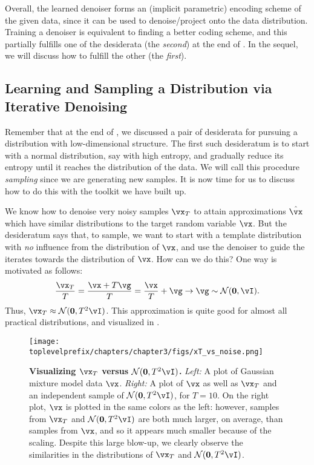 \documentclass[../../book-main.tex]{subfiles}
\begin{document}
Overall, the learned denoiser forms an (implicit parametric) encoding scheme of the given data, since it can be used to denoise/project onto the data distribution. Training a denoiser is equivalent to finding a better coding scheme, and this partially fulfills one of the desiderata (the \textit{second}) at the end of . In the sequel, we will discuss how to fulfill the other (the \textit{first}).


\subsection{Learning and Sampling a Distribution via Iterative Denoising}\label{sub:sampling_denoising}

Remember that at the end of , we discussed a pair of desiderata for pursuing a distribution with low-dimensional structure. The first such desideratum is to start with a normal distribution, say with high entropy, and gradually reduce its entropy until it reaches the distribution of the data. We will call this procedure \textit{sampling} since we are generating new samples. It is now time for us to discuss how to do this with the toolkit we have built up.

We know how to denoise very noisy samples \(\vx_{T}\) to attain approximations \(\hat{\vx}\) which have similar distributions to the target random variable \(\vx\). But the desideratum says that, to sample, we want to start with a template distribution with \textit{no} influence from the distribution of \(\vx\), and use the denoiser to guide the iterates towards the distribution of \(\vx\). How can we do this? One way is motivated as follows:
\begin{equation}\label{eq:ve_converge_to_large_gaussian}
	\frac{\vx_{T}}{T} = \frac{\vx + T\vg}{T} = \frac{\vx}{T} + \vg \to \vg \sim \dNorm(\vzero, \vI).
\end{equation}
Thus, \(\vx_{T} \approx \dNorm(\vzero, T^{2}\vI)\). This approximation is quite good for almost all practical distributions, and visualized in .
\begin{figure}
	\centering 
	\texttt{[image: \\toplevelprefix/chapters/chapter3/figs/xT\_vs\_noise.png]}
	\caption{\small\textbf{Visualizing \(\vx_{T}\) versus \(\dNorm(\vzero, T^{2}\vI)\).} \textit{Left:} A plot of Gaussian mixture model data \(\vx\). \textit{Right:} A plot of \(\vx\) as well as \(\vx_{T}\) and an independent sample of \(\dNorm(\vzero, T^{2}\vI)\), for \(T = 10\). On the right plot, \(\vx\) is plotted in the same colors as the left: however, samples from \(\vx_{T}\) and \(\dNorm(\vzero, T^{2}\vI)\) are both much larger, on average, than samples from \(\vx\), and so it appears much smaller because of the scaling. Despite this large blow-up, we clearly observe the similarities in the distributions of \(\vx_{T}\) and \(\dNorm(\vzero, T^{2}\vI)\).}
	\label{fig:xT_vs_noise}
\end{figure}
\end{document}

